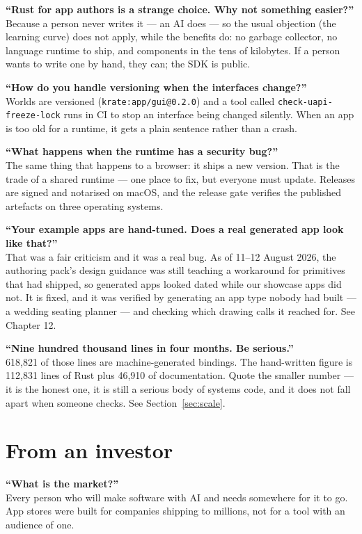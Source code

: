 \documentclass[11pt,a4paper]{report}
\begin{document}
\textbf{``Rust for app authors is a strange choice. Why not something
easier?''}\\
Because a person never writes it --- an AI does --- so the usual objection
(the learning curve) does not apply, while the benefits do: no garbage
collector, no language runtime to ship, and components in the tens of
kilobytes. If a person wants to write one by hand, they can; the SDK is
public.

\textbf{``How do you handle versioning when the interfaces change?''}\\
Worlds are versioned (\texttt{krate:app/gui@0.2.0}) and a tool called
\texttt{check-uapi-freeze-lock} runs in CI to stop an interface being
changed silently. When an app is too old for a runtime, it gets a plain
sentence rather than a crash.

\textbf{``What happens when the runtime has a security bug?''}\\
The same thing that happens to a browser: it ships a new version. That is
the trade of a shared runtime --- one place to fix, but everyone must
update. Releases are signed and notarised on macOS, and the release gate
verifies the published artefacts on three operating systems.

\textbf{``Your example apps are hand-tuned. Does a real generated app look
like that?''}\\
That was a fair criticism and it was a real bug. As of 11--12 August 2026,
the authoring pack's design guidance was still teaching a workaround for
primitives that had shipped, so generated apps looked dated while our
showcase apps did not. It is fixed, and it was verified by generating an
app type nobody had built --- a wedding seating planner --- and checking
which drawing calls it reached for. See Chapter 12.

\textbf{``Nine hundred thousand lines in four months. Be serious.''}\\
618{,}821 of those lines are machine-generated bindings. The hand-written
figure is 112{,}831 lines of Rust plus 46{,}910 of documentation. Quote the
smaller number --- it is the honest one, it is still a serious body of
systems code, and it does not fall apart when someone checks. See
Section~\ref{sec:scale}.

\section{From an investor}

\textbf{``What is the market?''}\\
Every person who will make software with AI and needs somewhere for it to
go. App stores were built for companies shipping to millions, not for a
tool with an audience of one.
\end{document}

